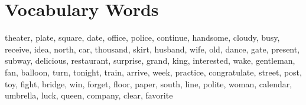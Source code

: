 \documentclass{article}
\begin{document}
\renewcommand{\familydefault}{\sfdefault}
\onehalfspacing
\fontsize{12pt}{14pt}\selectfont

\section*{Vocabulary Words}
\begin{addmargin}[1em]{1em}
    theater, plate, square, date, office, police, continue, handsome, cloudy, busy, receive, idea, north, car, thousand, skirt, husband, wife, old, dance, gate, present, subway, delicious, restaurant, surprise, grand, king, interested, wake, gentleman, fan, balloon, turn, tonight, train, arrive, week, practice, congratulate, street, post, toy, fight, bridge, win, forget, floor, paper, south, line, polite, woman, calendar, umbrella, luck, queen, company, clear, favorite
\end{addmargin}
\end{document}
